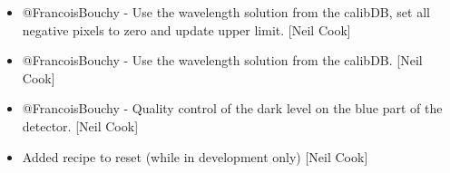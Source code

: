 \documentclass[a4paper,10pt,english]{report}
\begin{document}
\begin{itemize}
\item {} 
@FrancoisBouchy - Use the wavelength solution from the calibDB, set
all negative pixels to zero and update  upper limit.
{[}Neil Cook{]}

\item {} 
@FrancoisBouchy - Use the wavelength solution from the calibDB. {[}Neil
Cook{]}

\item {} 
@FrancoisBouchy - Quality control of the dark level on the blue part
of the detector. {[}Neil Cook{]}

\item {} 
Added recipe to reset (while in development only) {[}Neil Cook{]}

\end{itemize}
\end{document}
